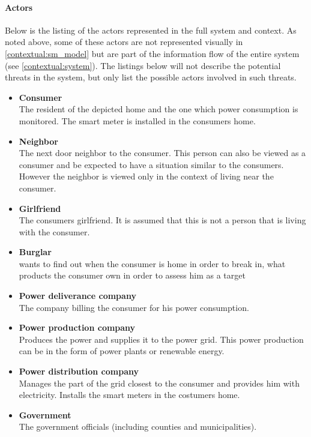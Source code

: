 \paragraph{Actors}
Below is the listing of the actors represented in the full system and context.
As noted above, some of these actors are not represented visually in \cref{contextual:sm_model} but are part of the information flow of the entire system (see \cref{contextual:system}).
The listings below will not describe the potential threats in the system, but only list the possible actors involved in such threats.
\begin{itemize}
\item \textbf{Consumer}\\
The resident of the depicted home and the one which power consumption is monitored.
The smart meter is installed in the consumers home.

\item \textbf{Neighbor}\\
The next door neighbor to the consumer.
This person can also be viewed as a consumer and be expected to have a situation similar to the consumers.
However the neighbor is viewed only in the context of living near the consumer.
\item \textbf{Girlfriend}\\
The consumers girlfriend.
It is assumed that this is not a person that is living with the consumer.
\item \textbf{Burglar}\\ wants to find out when the consumer is home in order to break in, what products the consumer own in order to assess him as a target

\item \textbf{Power deliverance company}\\
The company billing the consumer for his power consumption.
\item \textbf{Power production company}\\
Produces the power and supplies it to the power grid.
This power production can be in the form of power plants or renewable energy.
\item \textbf{Power distribution company}\\
Manages the part of the grid closest to the consumer and provides him with electricity.
Installs the smart meters in the costumers home.
\item \textbf{Government}\\
The government officials (including counties and municipalities).


\end{itemize}
